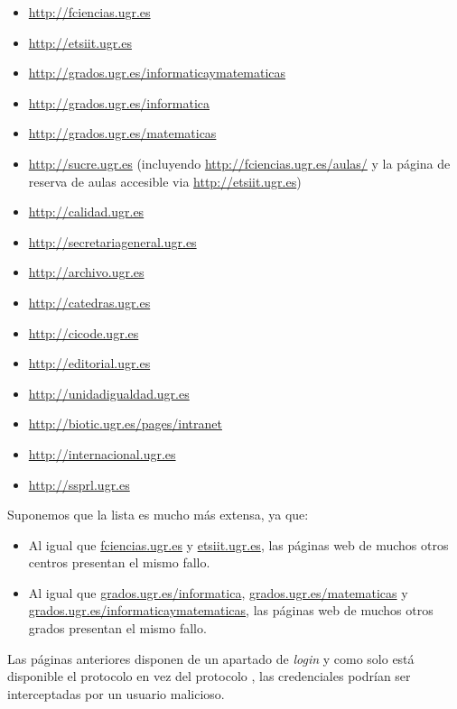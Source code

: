 \begin{itemize}
  \setlength\itemsep{0.1em}
  \item \url{http://fciencias.ugr.es}
  \item \url{http://etsiit.ugr.es}
  \item \url{http://grados.ugr.es/informaticaymatematicas}
  \item \url{http://grados.ugr.es/informatica}
  \item \url{http://grados.ugr.es/matematicas}
  \item \url{http://sucre.ugr.es} (incluyendo \url{http://fciencias.ugr.es/aulas/} y la página de reserva de aulas accesible via \url{http://etsiit.ugr.es})
  \item \url{http://calidad.ugr.es}
  \item \url{http://secretariageneral.ugr.es}
  \item \url{http://archivo.ugr.es}
  \item \url{http://catedras.ugr.es}
  \item \url{http://cicode.ugr.es}
  \item \url{http://editorial.ugr.es}
  \item \url{http://unidadigualdad.ugr.es}
  \item \url{http://biotic.ugr.es/pages/intranet}
  \item \url{http://internacional.ugr.es}
  \item \url{http://ssprl.ugr.es}
\end{itemize}
Suponemos que la lista es mucho más extensa, ya que:
\begin{itemize}
  \item Al igual que \href{http://fciencias.ugr.es}{fciencias.ugr.es} y \href{http://etsiit.ugr.es}{etsiit.ugr.es}, las páginas web de muchos otros centros presentan el mismo fallo.
  \item Al igual que \href{http://grados.ugr.es/informatica}{grados.ugr.es/informatica}, \href{http://grados.ugr.es/matematicas}{grados.ugr.es/matematicas} y \href{http://grados.ugr.es/informaticaymatematicas}{grados.ugr.es/informaticaymatematicas}, las páginas web de muchos otros grados presentan el mismo fallo.
\end{itemize}

Las páginas anteriores disponen de un apartado de \emph{login} y como solo está disponible el protocolo   en vez del protocolo  , las credenciales podrían ser interceptadas por un usuario malicioso.

